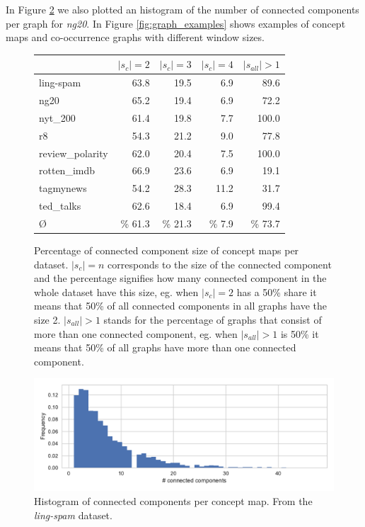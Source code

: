 In Figure \ref{fig:histogram_connected_components} we also plotted an histogram of the number of connected components per graph for \textit{ng20}.
In Figure \ref{fig:graph_examples} shows examples of concept maps and co-occurrence graphs with different window sizes.

\begin{figure}[htb!]
\centering
\begin{tabular}{lrrrr}
	{} &  $|s_c|=2$ &  $|s_c|=3$ &  $|s_c|=4$ & $|s_{all}| > 1$ \\
	\midrule
	ling-spam       & 63.8 & 19.5 & 6.9 & 89.6 \\
	ng20            & 65.2 & 19.4 & 6.9 & 72.2 \\
	nyt\_200         & 61.4 & 19.8 & 7.7 & 100.0 \\
	r8              & 54.3 & 21.2 & 9.0 & 77.8 \\
	review\_polarity & 62.0 & 20.4 & 7.5 & 100.0 \\
	rotten\_imdb     & 66.9 & 23.6 & 6.9 & 19.1 \\
	tagmynews       & 54.2 & 28.3 & 11.2 & 31.7 \\
	ted\_talks       & 62.6 & 18.4 & 6.9 & 99.4 \\
	\midrule
	\O            & \% 61.3 & \% 21.3 & \% 7.9 & \% 73.7 \\
	\bottomrule
\end{tabular}
\caption{Percentage of connected component size of concept maps per dataset. $|s_c|=n$ corresponds to the size of the connected component and the percentage signifies how many connected component in the whole dataset have this size, eg. when $|s_c|=2$ has a 50\% share it means that 50\% of all connected components in all graphs have the size 2. $|s_{all}| > 1$ stands for the percentage of graphs that consist of more than one connected component, eg. when $|s_{all}| > 1$ is 50\% it means that 50\% of all graphs have more than one connected component.}\label{fig:connected_component_percentage_per_size}
\end{figure}

\begin{figure}[htb!]
\centering
\includegraphics[width=0.8\linewidth]{assets/figures/hist-connected-components-ling-spam-CMap.pdf}
\caption{Histogram of connected components per concept map. From the \textit{ling-spam} dataset.}\label{fig:histogram_connected_components}
\end{figure}

